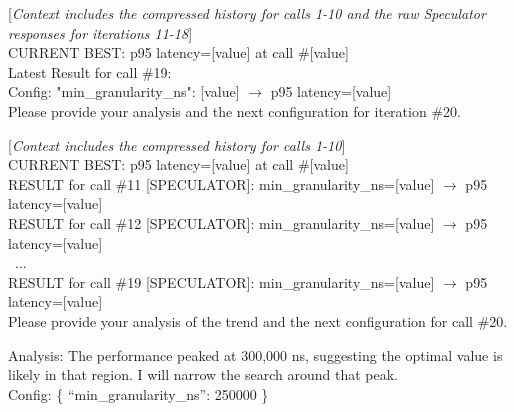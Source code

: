 \begin{tcolorbox}[
  breakable,
  enhanced,
  colback=gray!5!white,
  colframe=gray!60!black,
  title=Update for Speculator,
]
\small{

[\textit{Context includes the compressed history for calls 1-10 and the raw Speculator responses for iterations 11-18}]\\

CURRENT BEST: p95 latency=[value] at call \#[value]\\

Latest Result for call \#19: \\
Config: {"min\_granularity\_ns": [value]} $\rightarrow$ p95 latency=[value]\\

Please provide your analysis and the next configuration for iteration \#20.
}
\end{tcolorbox}

\begin{tcolorbox}[
  breakable,
  enhanced,
  colback=gray!5!white,
  colframe=gray!60!black,
  title=Update for Actor,
]

\small{

[\textit{Context includes the compressed history for calls 1-10}]\\

CURRENT BEST: p95 latency=[value] at call \#[value]\\

RESULT for call \#11 [SPECULATOR]: min\_granularity\_ns=[value] $\rightarrow$ p95 latency=[value]\\
RESULT for call \#12 [SPECULATOR]: min\_granularity\_ns=[value] $\rightarrow$ p95 latency=[value]\\
~...\\
RESULT for call \#19 [SPECULATOR]: min\_granularity\_ns=[value] $\rightarrow$ p95 latency=[value]\\

Please provide your analysis of the trend and the next configuration for call \#20.\\
}
\end{tcolorbox}


\begin{tcolorbox}[
  breakable,
  enhanced,
  colback=gray!5!white,
  colframe=gray!60!black,
  title=Sample Agent Response,
]
\small{
Analysis: The performance peaked at 300,000 ns, suggesting the optimal value is likely in that region. I will narrow the search around that peak.\\
Config: \{ ``min\_granularity\_ns'': 250000 \}
}
\end{tcolorbox}

